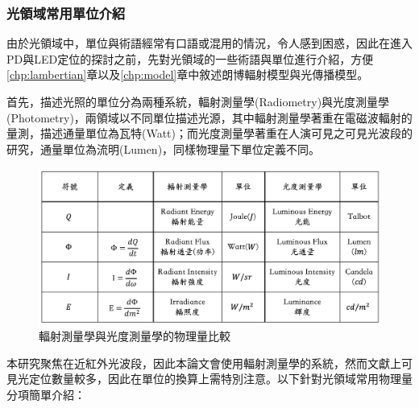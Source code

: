     \subsubsection{光領域常用單位介紹}
    \label{chp:light_unit}
    
    由於光領域中，單位與術語經常有口語或混用的情況，令人感到困惑，因此在進入PD與LED定位的探討之前，先對光領域的一些術語與單位進行介紹，方便\ref{chp:lambertian}章以及\ref{chp:model}章中敘述朗博輻射模型與光傳播模型。

    首先，描述光照的單位分為兩種系統，輻射測量學(Radiometry)與光度測量學(Photometry)，兩領域以不同單位描述光源，其中輻射測量學著重在電磁波輻射的量測，描述通量單位為瓦特(Watt)；而光度測量學著重在人演可見之可見光波段的研究，通量單位為流明(Lumen)，同樣物理量下單位定義不同\cite{radiometry_and_photometry}。
    

    \begin{figure}[htpb]
        \centering
        \includegraphics[width=14cm]{ch2pic/photometry_table.png}
        \caption{輻射測量學與光度測量學的物理量比較}
        \label{tab:photometry}
    \end{figure}


    本研究聚焦在近紅外光波段，因此本論文會使用輻射測量學的系統，然而文獻上可見光定位數量較多，因此在單位的換算上需特別注意。以下針對光領域常用物理量分項簡單介紹：


